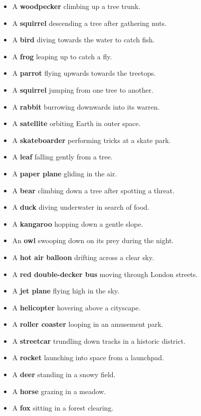 \begin{itemize}
    \item A \textbf{woodpecker} climbing up a tree trunk.
    \item A \textbf{squirrel} descending a tree after gathering nuts.
    \item A \textbf{bird} diving towards the water to catch fish.
    \item A \textbf{frog} leaping up to catch a fly.
    \item A \textbf{parrot} flying upwards towards the treetops.
    \item A \textbf{squirrel} jumping from one tree to another.
    \item A \textbf{rabbit} burrowing downwards into its warren.
    \item A \textbf{satellite} orbiting Earth in outer space.
    \item A \textbf{skateboarder} performing tricks at a skate park.
    \item A \textbf{leaf} falling gently from a tree.
    \item A \textbf{paper plane} gliding in the air.
    \item A \textbf{bear} climbing down a tree after spotting a threat.
    \item A \textbf{duck} diving underwater in search of food.
    \item A \textbf{kangaroo} hopping down a gentle slope.
    \item An \textbf{owl} swooping down on its prey during the night.
    \item A \textbf{hot air balloon} drifting across a clear sky.
    \item A \textbf{red double-decker bus} moving through London streets.
    \item A \textbf{jet plane} flying high in the sky.
    \item A \textbf{helicopter} hovering above a cityscape.
    \item A \textbf{roller coaster} looping in an amusement park.
    \item A \textbf{streetcar} trundling down tracks in a historic district.
    \item A \textbf{rocket} launching into space from a launchpad.
    \item A \textbf{deer} standing in a snowy field.
    \item A \textbf{horse} grazing in a meadow.
    \item A \textbf{fox} sitting in a forest clearing.

\end{itemize}
